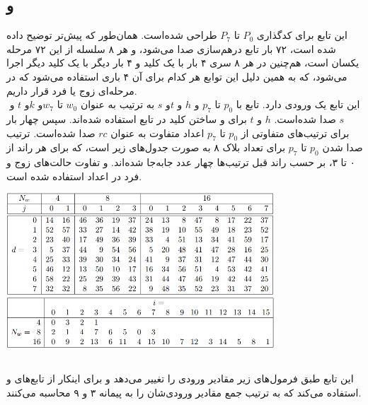 \subsection{و }
\label{subsec:TFBIG-4e}
\label{subsec:TFBIG-4o}

این تابع برای کدگذاری $ P_0 $ تا $ P_7 $ طراحی شده‌است. همان‌طور که پیش‌تر توضیح داده شده است، ۷۲ بار تابع درهم‌سازی صدا می‌شود،‌ و هر ۸ سلسله از این ۷۲ مرحله یکسان است، هم‌چنین در هر ۸ سری ۴ بار با یک کلید و ۴ بار دیگر با یک کلید دیگر اجرا می‌شود،‌ که به همین دلیل این توابع  هر کدام برای آن ۴ باری استفاده می‌شود که در مرحله‌ای زوج یا فرد قرار داریم.
\\
این تابع یک ورودی   دارد. تابع  \hyperref[subsec:TFBIG-ADDKEY]{} با ‌$ p_0 $ تا  $ p_7 $ و $ h $ و $ t $و ‌$ s $ به ترتیب به عنوان  $ w_0 $ تا $ w_7 $و $ k $و ‌$ t $ و ‌$ s $ صدا شده‌است. ‌$ h $ و $ t $ برای  و ساختن کلید در تابع  استفاده شده‌اند.
سپس   \hyperref[subsec:TFBIG-MIX8]{}چهار بار برای ترتیب‌های متفاوتی از ‌$ p_0 $ تا $ p_7 $ اعداد متفاوت به عنوان $ rc $ صدا شده‌است. ترتیب صدا شدن $ p_0 $ تا $ p_7 $ برای تعداد بلاک ۸ به صورت جدول‌های زیر است،‌ که برای هر ‌‌راند از ۰ تا ۳، بر حسب راند قبل ترتیب‌ها چهار عدد جابه‌جا شده‌اند. و تفاوت حالت‌های زوج و فرد در اعداد استفاده شده است.
\begin{center}
	\includegraphics[width=10cm]{images/table_mix.png}
	\includegraphics[width= 10cm]{images/Mix2.png}
\end{center}


\subsection{}
\label{subsec:TFBIG-ADDKEY}

این تابع طبق فرمول‌های زیر مقادیر ورودی را تغییر می‌دهد و برای اینکار از تابع‌های \hyperref[subsec:SKBI]{} و \hyperref[subsec:SKBI]{} استفاده می‌کند که به ترتیب جمع مقادیر ورودی‌شان را به پیمانه ۳ و ۹ محاسبه می‌کنند.

